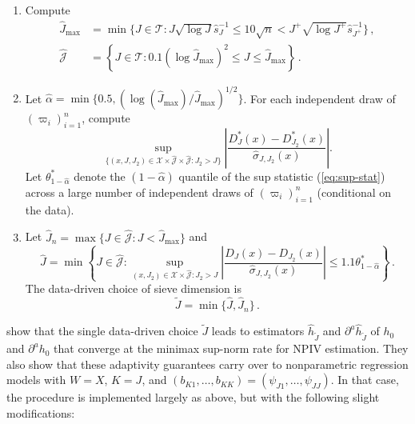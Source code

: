 \documentclass[
]{jss}
\begin{document}
\begin{enumerate}
\item Compute 
\begin{align}
 \hat{J}_{\max} & = \min \bigg \{ J \in \mathcal T :   J \sqrt{\log J}  \hat{s}_J^{-1}     \leq 10 \sqrt{n}  <  J^{+} \sqrt{\log J^{+}}   \hat{s}_{J^{+}}^{-1}  \bigg \} \,, \label{eq:J_hat_max} \\
 \hat{\mathcal J} & = \left\{ J \in \mathcal T : 0.1 ( \log \hat J_{\max})^2 \leq J \leq \hat J_{\max}\right\} \,. \label{eq:index_set}
\end{align}
\item Let $\hat \alpha = \min\{ 0.5 , (\log(\hat{J}_{\max})/\hat{J}_{\max})^{1/2}\}$.  For each independent draw of $(\varpi_i)_{i=1}^n$, compute
\begin{equation}\label{eq:sup-stat}
 \sup_{\{ (x,J,J_2) \in \mathcal{X} \times \hat{\mathcal J} \times \hat{\mathcal J} : J_2 > J \}} \left| \frac{D_{J}^*(x)-D_{J_2}^*(x)}{\hat \sigma_{J,J_2}(x)} \right|.
\end{equation}
Let $\theta^*_{1-\hat \alpha}$ denote the $(1- \hat \alpha )$ quantile of the sup statistic (\ref{eq:sup-stat}) across a large number  of independent draws of $(\varpi_i)_{i=1}^n$ (conditional on the data).
\item Let $\hat J_n = \max\{J \in \hat{\mathcal J} : J < \hat J_{\max}\}$ and
\begin{equation}\label{eq:J_lepski}
 \hat{J} = \min \left \{ J \in \hat{\mathcal J} : \sup_{(x, J_2) \in \mathcal{X} \times \hat{\mathcal{J}} : J_2 > J } \left| \frac{D_{J}(x)-D_{J_2}(x)}{\hat \sigma_{J,J_2}(x)} \right| \leq 1.1 \theta^*_{1 - \hat \alpha} \right \} \,.
\end{equation}
The data-driven choice of sieve dimension is
\begin{equation} \label{eq:J-choice}
 \tilde{J} = \min\{\hat{J},\hat J_n\}\,.
\end{equation}
\end{enumerate}

\citet{CCK} show that the single data-driven choice \(\tilde J\) leads
to estimators \(\hat h_{\tilde J}\) and \(\partial^a \hat h_{\tilde J}\)
of \(h_0\) and \(\partial^a h_0\) that converge at the minimax sup-norm
rate for NPIV estimation. They also show that these adaptivity
guarantees carry over to nonparametric regression models with \(W = X\),
\(K = J\), and
\((b_{K1},\ldots,b_{KK}) = (\psi_{J1},\ldots,\psi_{JJ})\). In that case,
the procedure is implemented largely as above, but with the following
slight modifications:
\end{document}

